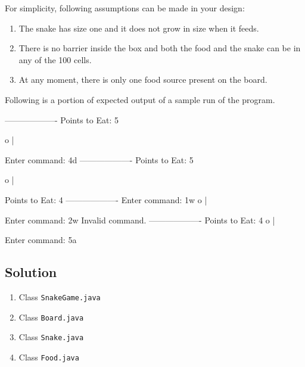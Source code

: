 \documentclass[12pt,letterpaper,twoside]{article}
\begin{document}
For simplicity, following assumptions can be made in your design:
\begin{enumerate}[itemsep=0mm,rightmargin=\leftmargin]
  \item The snake has size one and it does not grow in size when it feeds.
  \item There is no barrier inside the box and both the food and the snake can be in any of the 100 cells.
  \item At any moment, there is only one food source present on the board.
\end{enumerate}

Following is a portion of expected output of a sample run of the program.

\begin{terminal}
-------------------
Points to Eat: 5

       o
   |


Enter command: 4d
-------------------
Points to Eat: 5

       o
       |


Points to Eat: 4
-------------------
Enter command: 1w
  o
       |



Enter command: 2w
Invalid command.
-------------------
Points to Eat: 4
  o
       |



Enter command: 5a
\end{terminal}

\subsection*{Solution}

\lstset{language=java}
\begin{enumerate}
	\item Class \texttt{SnakeGame.java}
	
	\item Class \texttt{Board.java}
	
	\item Class \texttt{Snake.java}
	
  \item Class \texttt{Food.java}
	
\end{enumerate}
\end{document}
